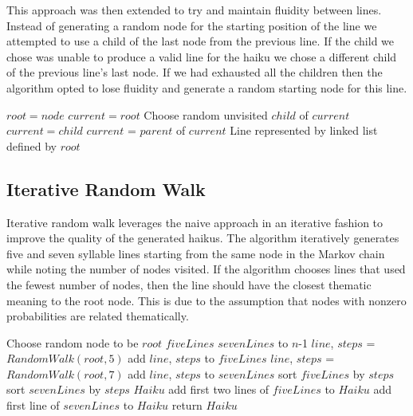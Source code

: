 \documentclass[]{article}
\begin{document}
This approach was then extended to try and maintain fluidity between lines. Instead of generating a random node for the starting position of the line we attempted to use a child of the last node from the previous line. If the child we chose was unable to produce a valid line for the haiku we chose a different child of the previous line's last node. If we had exhausted all the children then the algorithm opted to lose fluidity and generate a random starting node for this line.

\begin{algorithm}[H]
	\caption{$Depth\_First\_Search(node, n)$} \label{DFSB_WithStart}
	\begin{algorithmic}[1]
		\State $root = node$
		\State $current = root$
		\State Choose random unvisited $child$ of $current$
		\State $current = child$
		\EndIf
		\Else
		\Else
		\State $current$ = $parent$ of $current$
		\EndIf
		\EndIf
		\EndWhile
		\Return Line represented by linked list defined by $root$
	\end{algorithmic}
\end{algorithm}



\subsection{Iterative Random Walk}

Iterative random walk leverages the naive approach in an iterative fashion to improve the quality of the generated haikus. The algorithm iteratively generates five and seven syllable lines starting from the same node in the Markov chain while noting the number of nodes visited. If the algorithm chooses lines that used the fewest number of nodes, then the line should have the closest thematic meaning to the root node. This is due to the assumption that nodes with nonzero probabilities are related thematically.

\begin{algorithm}[H]
	\caption{$IterativeRandomWalk(n)$} \label{IterativeRandomWalk}
	\begin{algorithmic}[1]
		\State Choose random node to be $root$
		\State $fiveLines$
		\State $sevenLines$
		 to $n$-1
			\State $line$, $steps$ = $RandomWalk(root, 5)$
			\State add $line$, $steps$ to $fiveLines$
			\State $line$, $steps$ = $RandomWalk(root, 7)$
			\State add $line$, $steps$ to $sevenLines$ 
		\EndFor
		\State sort $fiveLines$ by $steps$
		\State sort $sevenLines$ by $steps$
		\State $Haiku$
		\State add first two lines of $fiveLines$ to $Haiku$
		\State add first line of $sevenLines$ to $Haiku$
		\State return $Haiku$
	\end{algorithmic}
\end{algorithm}
\end{document}
